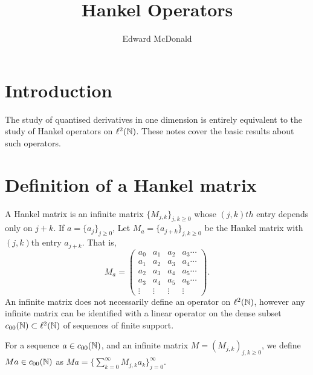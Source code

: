 \documentclass{unswmaths}
\begin{document}
\subject{Hankel Operators}
\author{Edward McDonald}
\title{Hankel Operators}

\newcommand{\Hilb}{\mathcal{H}}
\newcommand{\Proj}{\mathbf{P}}
\newcommand{\M}{\mathcal{M}}
\newcommand{\Dom}{\operatorname{Dom}}
\newcommand{\D}{\delta}
\newcommand{\Di}{\mathcal{D}}
\newcommand{\sgn}{\operatorname{sgn}}
\newcommand{\Ha}{\mathcal{H}}
\newcommand{\Span}{\operatorname{span}}
\newcommand{\dom}{\operatorname{dom}}
\newcommand{\BMO}{\operatorname{BMO}}
\newcommand{\VMO}{\operatorname{VMO}}
\newcommand{\rank}{\operatorname{rank}}

\setlength\parindent{0pt}


\section{Introduction}
The study of quantised derivatives in one dimension is entirely equivalent
to the study of Hankel operators on $\ell^2(\mathbb{N})$. These notes cover
the basic results about such operators. 

\section{Definition of a Hankel matrix}
A Hankel matrix is an infinite matrix $\{M_{j,k}\}_{j,k \geq 0}$
whose $(j,k)th$ entry depends only on $j+k$. If $a = \{a_j\}_{j\geq 0}$,
Let $M_a = \{a_{j+k}\}_{j,k\geq 0}$ be the Hankel matrix with $(j,k)$th
entry $a_{j+k}$. That is,
\begin{equation*}
    M_a = \begin{pmatrix}
        a_0 & a_1 & a_2 & a_3 \cdots\\
        a_1 & a_2 & a_3 & a_4 \cdots\\
        a_2 & a_3 & a_4 & a_5 \cdots\\
        a_3 & a_4 & a_5 & a_6 \cdots\\
        \vdots & \vdots & \vdots & \vdots 
    \end{pmatrix}.
\end{equation*}
An infinite matrix does not necessarily define an operator on $\ell^2(\mathbb{N})$, 
however any infinite matrix can be identified with a linear operator 
on the dense subset $c_{00}(\mathbb{N}) \subset \ell^2(\mathbb{N})$ of sequences
of finite support. 

For a sequence $a \in c_{00}(\mathbb{N})$, and an infinite matrix $M = (M_{j,k})_{j,k\geq 0}$, 
we define $Ma \in c_{00}(\mathbb{N})$ as $Ma = \{\sum_{k=0}^\infty M_{j,k}a_k\}_{j=0}^\infty$.
\end{document}
